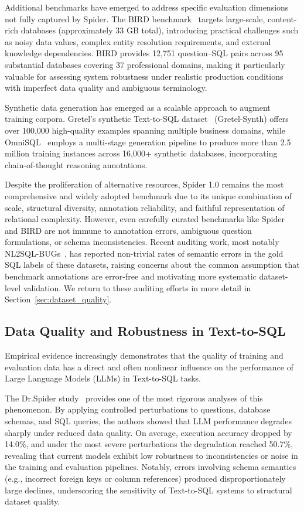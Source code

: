 \documentclass[print]{einformatica}
\begin{document}
Additional benchmarks have emerged to address specific evaluation dimensions not fully captured by Spider. The BIRD benchmark~\cite{li2023bird} targets large-scale, content-rich databases (approximately 33 GB total), introducing practical challenges such as noisy data values, complex entity resolution requirements, and external knowledge dependencies. BIRD provides 12,751 question--SQL pairs across 95 substantial databases covering 37 professional domains, making it particularly valuable for assessing system robustness under realistic production conditions with imperfect data quality and ambiguous terminology.

Synthetic data generation has emerged as a scalable approach to augment training corpora. Gretel's synthetic Text-to-SQL dataset~\cite{gretelSynthDataset} (Gretel-Synth) offers over 100,000 high-quality examples spanning multiple business domains, while OmniSQL~\cite{li2025omnisql} employs a multi-stage generation pipeline to produce more than 2.5 million training instances across 16,000+ synthetic databases, incorporating chain-of-thought reasoning annotations. 

Despite the proliferation of alternative resources, Spider 1.0 remains the most comprehensive and widely adopted benchmark due to its unique combination of scale, structural diversity, annotation reliability, and faithful representation of relational complexity. However, even carefully curated benchmarks like Spider and BIRD are not immune to annotation errors, ambiguous question formulations, or schema inconsistencies. Recent auditing work, most notably NL2SQL-BUGs~\cite{liu2025nl2sqlbugs}, has reported non-trivial rates of semantic errors in the gold SQL labels of these datasets, raising concerns about the common assumption that benchmark annotations are error-free and motivating more systematic dataset-level validation. We return to these auditing efforts in more detail in Section~\ref{sec:dataset_quality}.

\subsection{Data Quality and Robustness in Text-to-SQL}\label{sec:data_quality_robustness}

Empirical evidence increasingly demonstrates that the quality of training and evaluation data has a direct and often nonlinear influence on the performance of Large Language Models (LLMs) in Text-to-SQL tasks. 

The Dr.Spider study~\cite{chang2023drspider} provides one of the most rigorous analyses of this phenomenon. By applying controlled perturbations to questions, database schemas, and SQL queries, the authors showed that LLM performance degrades sharply under reduced data quality. On average, execution accuracy dropped by 14.0\%, and under the most severe perturbations the degradation reached 50.7\%, revealing that current models exhibit low robustness to inconsistencies or noise in the training and evaluation pipelines. Notably, errors involving schema semantics (e.g., incorrect foreign keys or column references) produced disproportionately large declines, underscoring the sensitivity of Text-to-SQL systems to structural dataset quality.
\end{document}
